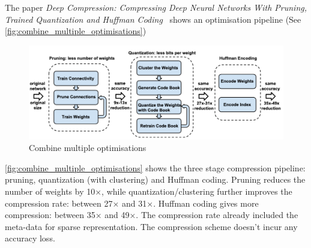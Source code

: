 The paper \textit{Deep Compression: Compressing Deep Neural Networks With
Pruning, Trained Quantization and Huffman Coding}~\cite{han2015deep} shows an
optimisation pipeline (See \autoref{fig:combine_multiple_optimisations})

\begin{figure}[ht]
    \includegraphics[width=\textwidth]{images/introduction/combine_multiple_optimisations.png}
    \centering
    \caption{Combine multiple optimisations}\label{fig:combine_multiple_optimisations}
\end{figure}

\autoref{fig:combine_multiple_optimisations} shows the three stage compression
pipeline: pruning, quantization (with clustering) and Huffman coding. Pruning
reduces the number of weights by 10×, while quantization/clustering further
improves the compression rate: between 27× and 31×. Huffman coding gives more
compression: between 35× and 49×. The compression rate already included the
meta-data for sparse representation. The compression scheme doesn't incur any
accuracy loss.
